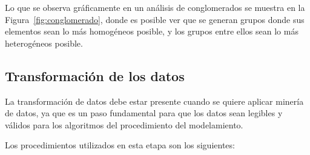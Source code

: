Lo que se observa gráficamente en un análisis de conglomerados se muestra en la Figura~\ref{fig:conglomerado}, donde es posible ver que se generan grupos donde sus elementos sean lo más homogéneos posible, y los grupos entre ellos sean lo más heterogéneos posible. \cite{dataclusreview}

\subsection{Transformación de los datos}
La transformación de datos debe estar presente cuando se quiere aplicar minería de datos, ya que es un paso fundamental para que los datos sean legibles y válidos para los algoritmos del procedimiento del modelamiento.

Los procedimientos utilizados en esta etapa son los siguientes:

